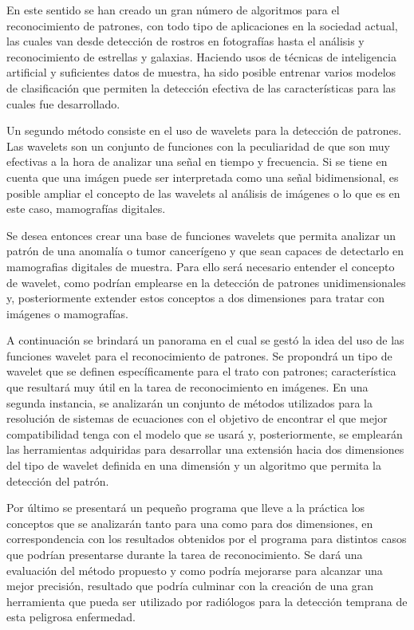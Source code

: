 \par En este sentido se han creado un gran n\'umero de algoritmos para el reconocimiento de patrones, con todo tipo de aplicaciones en la sociedad actual, las cuales van desde detecci\'on de rostros en fotograf\'ias hasta el an\'alisis y reconocimiento de estrellas y galaxias. Haciendo usos de t\'ecnicas de inteligencia artificial y suficientes datos de muestra, ha sido posible entrenar varios modelos de clasificaci\'on que permiten la detecci\'on efectiva de las caracter\'isticas para las cuales fue desarrollado.

\par Un segundo m\'etodo consiste en el uso de wavelets para la detecci\'on de patrones. Las wavelets son un conjunto de funciones con la peculiaridad de que son muy efectivas a la hora de analizar una se\~nal en tiempo y frecuencia. Si se tiene en cuenta que una im\'agen puede ser interpretada como una se\~nal bidimensional, es posible ampliar el concepto de las wavelets al an\'alisis de im\'agenes o lo que es en este caso, mamograf\'ias digitales.

\par Se desea entonces crear una base de funciones wavelets que permita analizar un patr\'on de una anomal\'ia o tumor cancer\'igeno y que sean capaces de detectarlo en mamografias digitales de muestra. Para ello ser\'a necesario entender el concepto de wavelet, como podr\'ian emplearse en la detecci\'on de patrones unidimensionales y, posteriormente extender estos conceptos a dos dimensiones para tratar con im\'agenes o mamograf\'ias.

\par A continuaci\'on se brindar\'a un panorama en el cual se gest\'o la idea del uso de las funciones wavelet para el reconocimiento de patrones. Se propondr\'a un tipo de wavelet que se definen espec\'ificamente para el trato con patrones; caracter\'istica que resultar\'a muy \'util en la tarea de reconocimiento en im\'agenes. En una segunda instancia, se analizar\'an un conjunto de m\'etodos utilizados para la resoluci\'on de sistemas de ecuaciones con el objetivo de encontrar el que mejor compatibilidad tenga con el modelo que se usar\'a y, posteriormente, se emplear\'an las herramientas adquiridas para desarrollar una extensi\'on hacia dos dimensiones del tipo de wavelet definida en una dimensi\'on y un algoritmo que permita la detecci\'on del patr\'on.

\par Por \'ultimo se presentar\'a un peque\~no programa que lleve a la pr\'actica los conceptos que se analizar\'an tanto para una como para dos dimensiones, en correspondencia con los resultados obtenidos por el programa para distintos casos que podr\'ian presentarse durante la tarea de reconocimiento. Se dar\'a una evaluaci\'on del m\'etodo propuesto y como podr\'ia mejorarse para alcanzar una mejor precisi\'on, resultado que podr\'ia culminar con la creaci\'on de una gran herramienta que pueda ser utilizado por radi\'ologos para la detecci\'on temprana de esta peligrosa enfermedad.